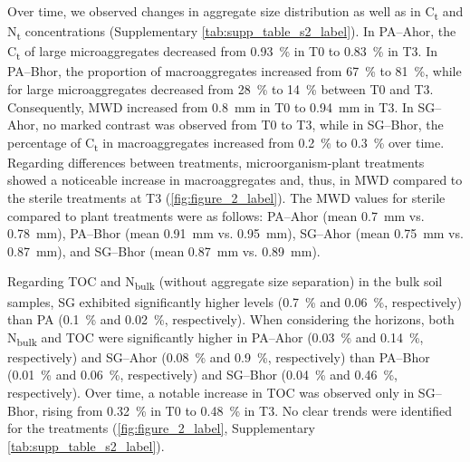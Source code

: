 Over time, we observed changes in aggregate size distribution as well as in C\textsubscript{t} and N\textsubscript{t} concentrations (Supplementary \cref{tab:supp_table_s2_label}). In PA--Ahor, the C\textsubscript{t} of large microaggregates decreased from \SI{0.93}{\percent} in T0 to \SI{0.83}{\percent} in T3. In PA--Bhor, the proportion of macroaggregates increased from \SI{67}{\percent} to \SI{81}{\percent}, while for large microaggregates decreased from \SI{28}{\percent} to \SI{14}{\percent} between T0 and T3. Consequently, MWD increased from \SI{0.8}{\milli\metre} in T0 to \SI{0.94}{\milli\metre} in T3. In SG--Ahor, no marked contrast was observed from T0 to T3, while in SG--Bhor, the percentage of C\textsubscript{t} in macroaggregates increased from \SI{0.2}{\percent} to \SI{0.3}{\percent} over time. Regarding differences between treatments, microorganism-plant treatments showed a noticeable increase in macroaggregates and, thus, in MWD compared to the sterile treatments at T3 (\cref{fig:figure_2_label}). The MWD values for sterile compared to plant treatments were as follows: PA--Ahor (mean \SI{0.7}{mm} vs. \SI{0.78}{\milli\metre}), PA--Bhor (mean \SI{0.91}{mm} vs. \SI{0.95}{\milli\metre}), SG--Ahor (mean \SI{0.75}{mm} vs. \SI{0.87}{\milli\metre}), and SG--Bhor (mean \SI{0.87}{mm} vs. \SI{0.89}{\milli\metre}).

Regarding TOC and N\textsubscript{bulk} (without aggregate size separation) in the bulk soil samples, SG exhibited significantly higher levels (\SI{0.7}{\percent} and \SI{0.06}{\percent}, respectively) than PA (\SI{0.1}{\percent} and \SI{0.02}{\percent}, respectively). When considering the horizons, both N\textsubscript{bulk} and TOC were significantly higher in PA--Ahor (\SI{0.03}{\percent} and \SI{0.14}{\percent}, respectively) and SG--Ahor (\SI{0.08}{\percent} and \SI{0.9}{\percent}, respectively) than PA--Bhor (\SI{0.01}{\percent} and \SI{0.06}{\percent}, respectively) and SG--Bhor (\SI{0.04}{\percent} and \SI{0.46}{\percent}, respectively). Over time, a notable increase in TOC was observed only in SG--Bhor, rising from \SI{0.32}{\percent} in T0 to \SI{0.48}{\percent} in T3. No clear trends were identified for the treatments (\cref{fig:figure_2_label}, Supplementary \cref{tab:supp_table_s2_label}).

